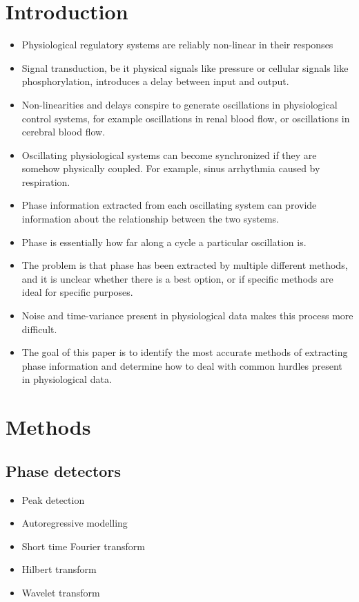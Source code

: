 \documentclass{article}
\begin{document}
\section*{Introduction}
\begin{itemize}
\item Physiological regulatory systems are reliably non-linear in their responses
\item Signal transduction, be it physical signals like pressure or cellular signals like phosphorylation, introduces a delay between input and output. 
\item Non-linearities and delays conspire to generate oscillations in physiological control systems, for example oscillations in renal blood flow, or oscillations in cerebral blood flow.
\item Oscillating physiological systems can become synchronized if they are somehow physically coupled. For example, sinus arrhythmia caused by respiration. 
\item Phase information extracted from each oscillating system can provide information about the relationship between the two systems.
\item Phase is essentially how far along a cycle a particular oscillation is. 
\item The problem is that phase has been extracted by multiple different methods, and it is unclear whether there is a best option, or if specific methods are ideal for specific purposes.
\item Noise and time-variance present in physiological data makes this process more difficult.
\item The goal of this paper is to identify the most accurate methods of extracting phase information and determine how to deal with common hurdles present in physiological data.
\end{itemize}

\section*{Methods}

\subsection*{Phase detectors}
\begin{itemize}
\item Peak detection
\item Autoregressive modelling
\item Short time Fourier transform
\item Hilbert transform
\item Wavelet transform
\end{itemize}
\end{document}
